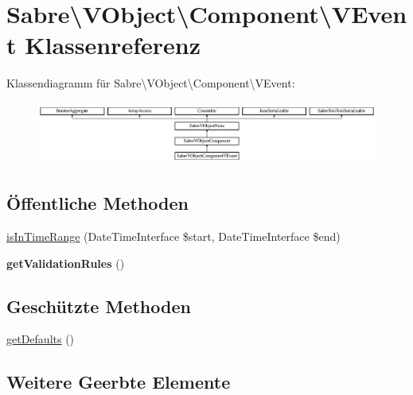\hypertarget{class_sabre_1_1_v_object_1_1_component_1_1_v_event}{}\section{Sabre\textbackslash{}V\+Object\textbackslash{}Component\textbackslash{}V\+Event Klassenreferenz}
\label{class_sabre_1_1_v_object_1_1_component_1_1_v_event}
Klassendiagramm für Sabre\textbackslash{}V\+Object\textbackslash{}Component\textbackslash{}V\+Event\+:\begin{figure}[H]
\begin{center}
\leavevmode
\includegraphics[height=2.074074cm]{class_sabre_1_1_v_object_1_1_component_1_1_v_event}
\end{center}
\end{figure}
\subsection*{Öffentliche Methoden}
\begin{DoxyCompactItemize}
\item 
\mbox{\hyperlink{class_sabre_1_1_v_object_1_1_component_1_1_v_event_a784763b0a8689a0d549f478f6d855096}{is\+In\+Time\+Range}} (Date\+Time\+Interface \$start, Date\+Time\+Interface \$end)
\item 
\mbox{\label{class_sabre_1_1_v_object_1_1_component_1_1_v_event_af86dab16efba7da200606bd8f9f511d7}} 
{\bfseries get\+Validation\+Rules} ()
\end{DoxyCompactItemize}
\subsection*{Geschützte Methoden}
\begin{DoxyCompactItemize}
\item 
\mbox{\hyperlink{class_sabre_1_1_v_object_1_1_component_1_1_v_event_af7f3b1c7d63bf9834f7722248db12b8a}{get\+Defaults}} ()
\end{DoxyCompactItemize}
\subsection*{Weitere Geerbte Elemente}


